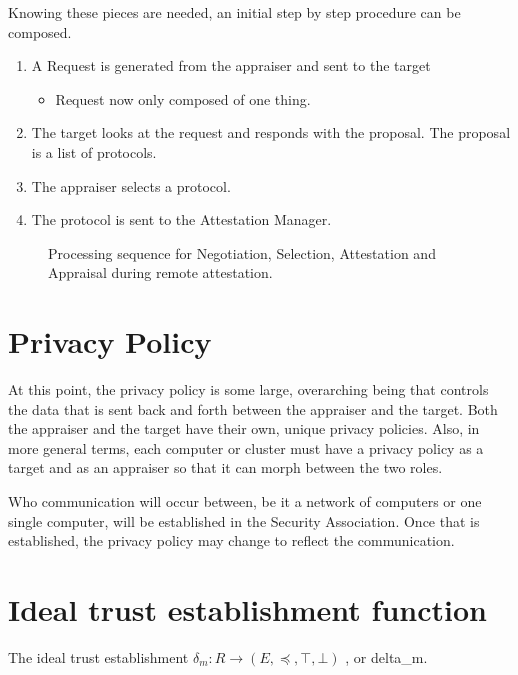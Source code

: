 \documentclass[10pt]{report}
\begin{document}
\begin{itemize}
\end{itemize}

Knowing these pieces are needed, an initial step by step procedure can be composed.
\begin{enumerate}
\item A Request is generated from the appraiser and sent to the target
	\begin{itemize}
	\item Request now only composed of one thing.
	\end{itemize}
\item The target looks at the request and responds with the proposal. The
        proposal is a list of protocols. 
\item The appraiser selects a protocol.
\item The protocol is sent to the Attestation Manager.  
\end{enumerate} 

\begin{figure}[hbtp]
  \centering
  
  \caption[Attestation and Appraisal Sequence for One Request]{Processing sequence for
    Negotiation, Selection, Attestation and Appraisal during remote
    attestation.}
  \label{fig:att-app-seq}
\end{figure}

\section {Privacy Policy}

At this point, the privacy policy is some large, overarching being
that controls the data that is sent back and forth between the appraiser
and the target. Both the appraiser and the target have their own, unique
privacy policies. Also, in more general terms, each computer or cluster
must have a privacy policy as a target and as an appraiser so that it
can morph between the two roles. 

Who communication will occur between, be it a network of computers or
one single computer, will be established in the Security Association.
Once that is established, the privacy policy may change to reflect
the communication. 

\section {Ideal trust establishment function}

The ideal trust establishment $\delta_m:R\rightarrow (E,\preceq,\top,\bot)$ ,
or delta_m. 
\end{document}

